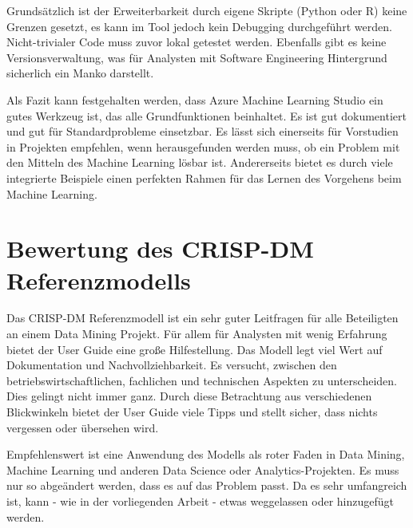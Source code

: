 Grundsätzlich ist der Erweiterbarkeit durch eigene Skripte (Python oder R) keine Grenzen gesetzt, es kann im Tool jedoch kein Debugging durchgeführt werden. Nicht-trivialer Code muss zuvor lokal getestet werden. Ebenfalls gibt es keine Versionsverwaltung, was für Analysten mit Software Engineering Hintergrund sicherlich ein Manko darstellt.\par
Als Fazit kann festgehalten werden, dass Azure Machine Learning Studio ein gutes Werkzeug ist, das alle Grundfunktionen beinhaltet. Es ist gut dokumentiert und gut für Standardprobleme einsetzbar. Es lässt sich einerseits für Vorstudien in Projekten empfehlen, wenn herausgefunden werden muss, ob ein Problem mit den Mitteln des Machine Learning lösbar ist. Andererseits bietet es durch viele integrierte Beispiele einen perfekten Rahmen für das Lernen des Vorgehens beim Machine Learning.

\section{Bewertung des CRISP-DM Referenzmodells}\label{sec:BeswertungCrisp}
Das CRISP-DM Referenzmodell ist ein sehr guter Leitfragen für alle Beteiligten an einem Data Mining Projekt. Für allem für Analysten mit wenig Erfahrung bietet der User Guide eine große Hilfestellung. Das Modell legt viel Wert auf Dokumentation und Nachvollziehbarkeit. Es versucht, zwischen den betriebswirtschaftlichen, fachlichen und technischen Aspekten zu unterscheiden. Dies gelingt nicht immer ganz. Durch diese Betrachtung aus verschiedenen Blickwinkeln bietet der User Guide viele Tipps und stellt sicher, dass nichts vergessen oder übersehen wird.\par
Empfehlenswert ist eine Anwendung des Modells als roter Faden in Data Mining, Machine Learning und anderen Data Science oder Analytics-Projekten. Es muss nur so abgeändert werden, dass es auf das Problem passt. Da es sehr umfangreich ist, kann - wie in der vorliegenden Arbeit - etwas weggelassen oder hinzugefügt werden.

